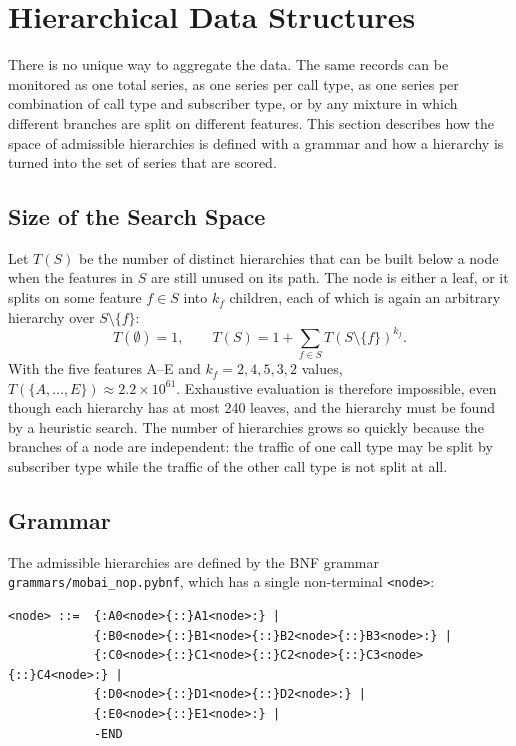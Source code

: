 \section{Hierarchical Data Structures}
\label{sec:hierarchies}

There is no unique way to aggregate the data.
The same records can be monitored as one total series, as one series per call type, as one series per combination of call type and subscriber type, or by any mixture in which different branches are split on different features.
This section describes how the space of admissible hierarchies is defined with a grammar and how a hierarchy is turned into the set of series that are scored.

\subsection{Size of the Search Space}

Let $T(S)$ be the number of distinct hierarchies that can be built below a node when the features in $S$ are still unused on its path.
The node is either a leaf, or it splits on some feature $f \in S$ into $k_f$ children, each of which is again an arbitrary hierarchy over $S \setminus \{f\}$:
\begin{equation}
    T(\emptyset) = 1,
    \qquad
    T(S) = 1 + \sum_{f \in S} T(S \setminus \{f\})^{k_f}.
\end{equation}
With the five features A--E and $k_f = 2, 4, 5, 3, 2$ values, $T(\{A,\dots,E\}) \approx 2.2 \times 10^{61}$.
Exhaustive evaluation is therefore impossible, even though each hierarchy has at most 240 leaves, and the hierarchy must be found by a heuristic search.
The number of hierarchies grows so quickly because the branches of a node are independent: the traffic of one call type may be split by subscriber type while the traffic of the other call type is not split at all.

\subsection{Grammar}
\label{sec:grammar}

The admissible hierarchies are defined by the \ac{BNF} grammar \texttt{grammars/mobai\_nop.pybnf}, which has a single non-terminal \texttt{<node>}:

\begin{lstlisting}[basicstyle=\ttfamily\small, columns=fullflexible, frame=single]
<node> ::=  {:A0<node>{::}A1<node>:} |
            {:B0<node>{::}B1<node>{::}B2<node>{::}B3<node>:} |
            {:C0<node>{::}C1<node>{::}C2<node>{::}C3<node>{::}C4<node>:} |
            {:D0<node>{::}D1<node>{::}D2<node>:} |
            {:E0<node>{::}E1<node>:} |
            -END
\end{lstlisting}

